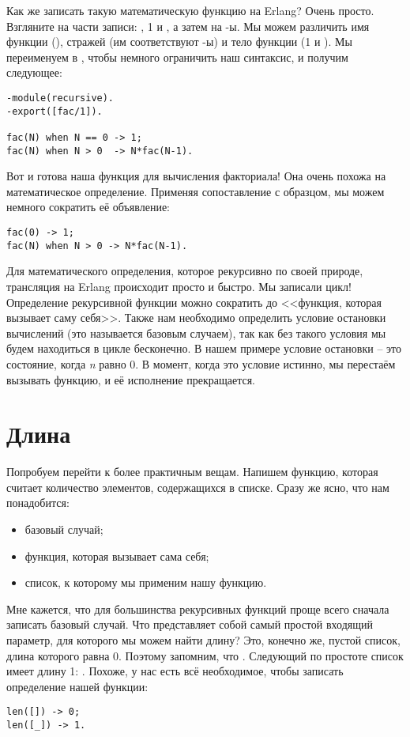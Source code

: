 Как же записать такую математическую функцию на Erlang? Очень просто.
Взгляните на части записи: , 1 и , а затем на \--ы.
Мы можем различить имя функции (), стражей (им соответствуют \--ы) и тело функции (1 и ).
Мы переименуем  в , чтобы немного ограничить наш синтаксис, и получим следующее:
\begin{lstlisting}[style=erlang]
-module(recursive).
-export([fac/1]).
 
fac(N) when N == 0 -> 1;
fac(N) when N > 0  -> N*fac(N-1).
\end{lstlisting}

Вот и готова наша функция для вычисления факториала!
Она очень похожа на математическое определение.
Применяя сопоставление с образцом, мы можем немного сократить её объявление:
\begin{lstlisting}[style=erlang]
fac(0) -> 1;
fac(N) when N > 0 -> N*fac(N-1).
\end{lstlisting}

Для математического определения, которое рекурсивно по своей природе, трансляция на Erlang происходит просто и быстро.
Мы записали цикл!
Определение рекурсивной функции можно сократить до <<функция, которая вызывает саму себя>>.
Также нам необходимо определить условие остановки вычислений (это называется базовым случаем), так как без такого условия мы будем находиться в цикле бесконечно.
В нашем примере условие остановки \--- это состояние, когда \emph{n} равно 0.
В момент, когда это условие истинно, мы перестаём вызывать функцию, и её исполнение прекращается. 
\section{Длина}
\label{length}
Попробуем перейти к более практичным вещам.
Напишем функцию, которая считает количество элементов, содержащихся в списке.
Сразу же ясно, что нам понадобится:\\
\begin{itemize}
\item базовый случай;
\item функция, которая вызывает сама себя;
\item список, к которому мы применим нашу функцию.
\end{itemize}

Мне кажется, что для большинства рекурсивных функций проще всего сначала записать базовый случай.
Что представляет собой самый простой входящий параметр, для которого мы можем найти длину?
Это, конечно же, пустой список, длина которого равна 0.
Поэтому запомним, что .
Следующий по простоте список имеет длину 1: .
Похоже, у нас есть всё необходимое, чтобы записать определение нашей функции:
\begin{lstlisting}[style=erlang]
len([]) -> 0;
len([_]) -> 1.
\end{lstlisting}

